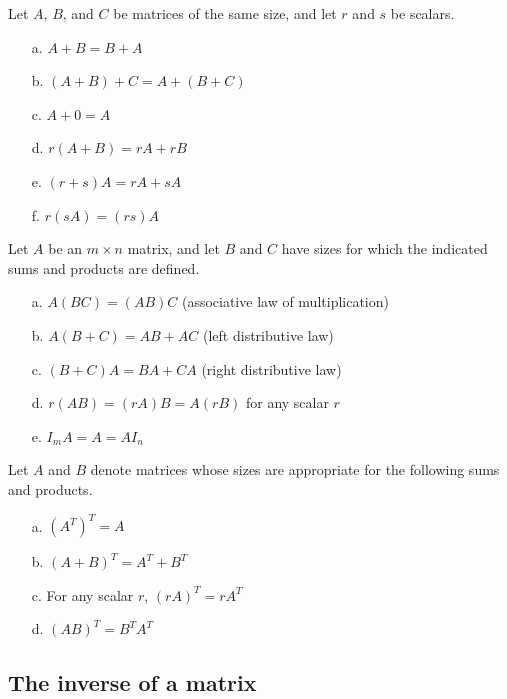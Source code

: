 \documentclass{article}
\begin{document}
\begin{thm}
    Let $A$, $B$, and $C$ be matrices of the same size, and let $r$ and $s$ be scalars.
    \begin{enumerate}
        \item[a.] $A+B=B+A$
        \item[b.] $(A+B)+C=A+(B+C)$
        \item[c.] $A+0=A$
        \item[d.] $r(A+B)=rA+rB$
        \item[e.] $(r+s)A=rA+sA$
        \item[f.] $r(sA)=(rs)A$
    \end{enumerate}
\end{thm}

\begin{thm} 
    Let $A$ be an $m\times n$ matrix, and let $B$ and $C$ have sizes for which the indicated sums and products are defined.
    \begin{enumerate}
        \item[a.] $A(BC)=(AB)C$ \hfill(associative law of multiplication)
        \item[b.] $A(B+C)=AB+AC$ \hfill(left distributive law)
        \item[c.] $(B+C)A=BA+CA$ \hfill(right distributive law)
        \item[d.] $r(AB)=(rA)B=A(rB)$ \hfill for any scalar $r$
        \item[e.] $I_mA=A=AI_n$
    \end{enumerate}
\end{thm}

\begin{thm} 
    Let $A$ and $B$ denote matrices whose sizes are appropriate for the following sums and products.
    \begin{enumerate}
        \item[a.] $(A^T)^T=A$
        \item[b.] $(A+B)^T=A^T+B^T$
        \item[c.] For any scalar $r$, $(rA)^T=rA^T$
        \item[d.] $(AB)^T=B^TA^T$
    \end{enumerate}
\end{thm}

\subsection{The inverse of a matrix}
\end{document}
